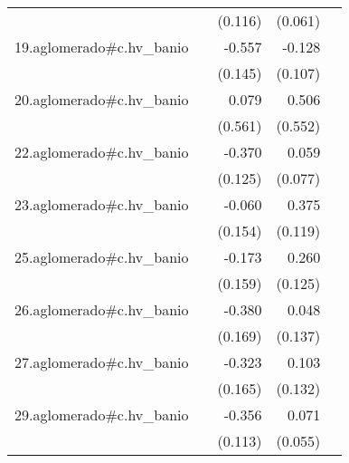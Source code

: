 {\begin{longtable}{l*{4}{D{.}{.}{-1}}}
            &                     &     (0.116)         &     (0.061)         &                     \\
\addlinespace
19.aglomerado#c.hv\_banio&                     &      -0.557\sym{***}&      -0.128         &                     \\
            &                     &     (0.145)         &     (0.107)         &                     \\
\addlinespace
20.aglomerado#c.hv\_banio&                     &       0.079         &       0.506         &                     \\
            &                     &     (0.561)         &     (0.552)         &                     \\
\addlinespace
22.aglomerado#c.hv\_banio&                     &      -0.370\sym{**} &       0.059         &                     \\
            &                     &     (0.125)         &     (0.077)         &                     \\
\addlinespace
23.aglomerado#c.hv\_banio&                     &      -0.060         &       0.375\sym{**} &                     \\
            &                     &     (0.154)         &     (0.119)         &                     \\
\addlinespace
25.aglomerado#c.hv\_banio&                     &      -0.173         &       0.260\sym{*}  &                     \\
            &                     &     (0.159)         &     (0.125)         &                     \\
\addlinespace
26.aglomerado#c.hv\_banio&                     &      -0.380\sym{*}  &       0.048         &                     \\
            &                     &     (0.169)         &     (0.137)         &                     \\
\addlinespace
27.aglomerado#c.hv\_banio&                     &      -0.323\sym{*}  &       0.103         &                     \\
            &                     &     (0.165)         &     (0.132)         &                     \\
\addlinespace
29.aglomerado#c.hv\_banio&                     &      -0.356\sym{**} &       0.071         &                     \\
            &                     &     (0.113)         &     (0.055)         &                     \\

\end{longtable}}
